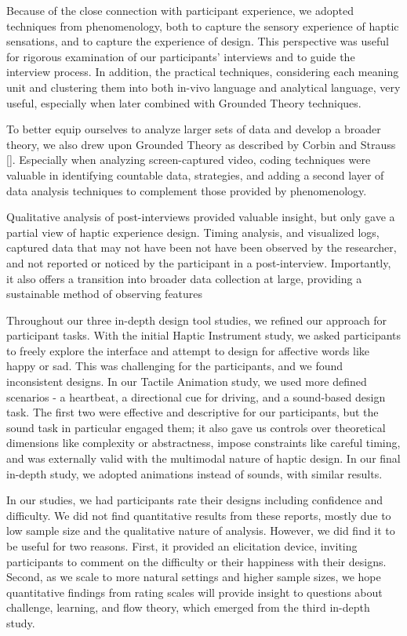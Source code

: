 Because of the close connection with participant experience, we adopted techniques from phenomenology, both to capture the sensory experience of haptic sensations, and to capture the experience of design.
This perspective was useful for rigorous examination of our participants' interviews and to guide the interview process.
In addition, the practical techniques, considering each meaning unit and clustering them into both in-vivo language and analytical language, very useful, especially when later combined with Grounded Theory techniques.

To better equip ourselves to analyze larger sets of data and develop a broader theory, we also drew upon Grounded Theory as described by Corbin and Strauss [].
Especially when analyzing screen-captured video, coding techniques were valuable in identifying countable data, strategies, and adding a second layer of data analysis techniques to complement those provided by phenomenology.

Qualitative analysis of post-interviews provided valuable insight, but only gave a partial view of haptic experience design.
Timing analysis, and visualized logs, captured data that may not have been not have been observed by the researcher, and not reported or noticed by the participant in a post-interview.
Importantly, it also offers a transition into broader data collection at large, providing a sustainable method of observing features


Throughout our three in-depth design tool studies, we refined our approach for participant tasks.
With the initial Haptic Instrument study, we asked participants to freely explore the interface and attempt to design for affective words like happy or sad.
This was challenging for the participants, and we found inconsistent designs. 
In our Tactile Animation study, we used more defined scenarios - a heartbeat, a directional cue for driving, and a sound-based design task.
The first two were effective and descriptive for our participants, but the sound task in particular engaged them; it also gave us controls over theoretical dimensions like complexity or abstractness, impose constraints like careful timing, and was externally valid with the multimodal nature of haptic design.
In our final in-depth study, we adopted animations instead of sounds, with similar results.

In our studies, we had participants rate their designs including confidence and difficulty.
We did not find quantitative results from these reports, mostly due to low sample size and the qualitative nature of analysis.
However, we did find it to be useful for two reasons.
First, it provided an elicitation device, inviting participants to comment on the difficulty or their happiness with their designs.
Second, as we scale to more natural settings and higher sample sizes, we hope quantitative findings from rating scales will provide insight to questions about challenge, learning, and flow theory, which emerged from the third in-depth study.


